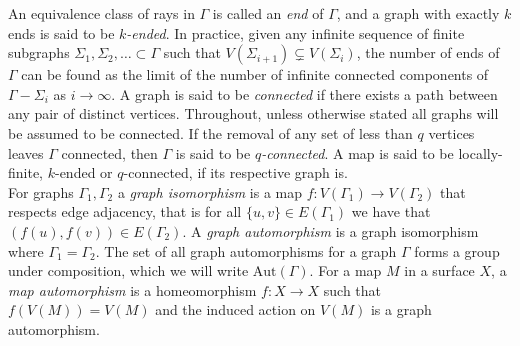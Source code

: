 \documentclass{article}
\numberwithin{equation}{section}
\theoremstyle{definition}
\theoremstyle{remark}
\begin{document}
An equivalence class of rays in $\Gamma$ is called an \textit{end} of $\Gamma$, and a graph with exactly $k$ ends is said to be $k$\textit{-ended}. In practice, given any infinite sequence of finite subgraphs $\Sigma_1,\Sigma_2,\ldots\subset \Gamma$ such that $V(\Sigma_{i+1})\subsetneq V(\Sigma_i)$, the number of ends of $\Gamma$ can be found as the limit of the number of infinite connected components of $\Gamma-\Sigma_i$ as $i\rightarrow\infty$. 
A graph is said to be \textit{connected} if there exists a path between any pair of distinct vertices. Throughout, unless otherwise stated all graphs will be assumed to be connected. If the removal of any set of less than $q$ vertices leaves $\Gamma$ connected, then $\Gamma$ is said to be $q$\textit{-connected}. 
A map is said to be locally-finite, $k$-ended or $q$-connected, if its respective graph is.\\
For graphs $\Gamma_1,\Gamma_2$ a \textit{graph isomorphism} is a map $f:V(\Gamma_1)\rightarrow V(\Gamma_2)$ that respects edge adjacency, that is for all $\{u,v\}\in E(\Gamma_1)$ we have that $(f(u),f(v))\in E(\Gamma_2)$.
A \textit{graph automorphism} is a graph isomorphism where $\Gamma_1=\Gamma_2$. The set of all graph automorphisms for a graph $\Gamma$ forms a group under composition, which we will write $\text{Aut}(\Gamma)$. 
For a map $M$ in a surface $X$, a \textit{map automorphism} is a homeomorphism $f:X\rightarrow X$ such that $f(V(M))=V(M)$ and the induced action on $V(M)$ is a graph automorphism.
\end{document}
